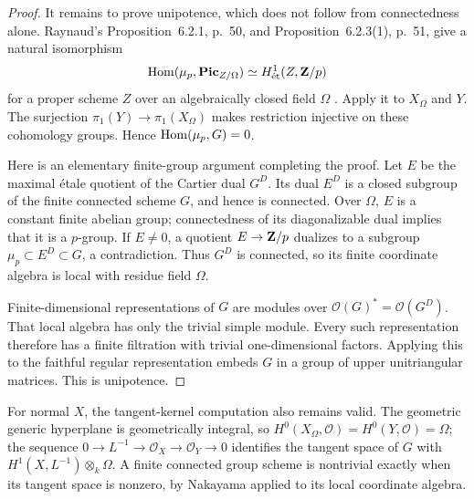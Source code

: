 \begin{proof}
It remains to prove unipotence, which does not follow from
connectedness alone. Raynaud's Proposition~6.2.1, p.~50, and
Proposition~6.2.3(1), p.~51, give a natural isomorphism
\[
 \operatorname{Hom}(\mu_p,\mathbf{Pic}_{Z/\Omega})
       \simeq H^1_{\text{ét}}(Z,\mathbf Z/p)
\]
for a proper scheme $Z$ over an algebraically closed field $\Omega$
\cite{Raynaud1970PicardDuality}. Apply it to $X_\Omega$ and $Y$.
The surjection $\pi_1(Y)\to\pi_1(X_\Omega)$ makes restriction
injective on these cohomology groups. Hence $\operatorname{Hom}(\mu_p,G)=0$.

Here is an elementary finite-group argument completing the proof.
Let $E$ be the maximal étale quotient of the Cartier dual $G^D$.
Its dual $E^D$ is a closed subgroup of the finite connected scheme
$G$, and hence is connected. Over $\Omega$, $E$ is a constant finite
abelian group; connectedness of its diagonalizable dual implies
that it is a $p$-group. If $E\ne0$, a quotient $E\to\mathbf Z/p$ dualizes
to a subgroup $\mu_p\subset E^D\subset G$, a contradiction.
Thus $G^D$ is connected, so its finite coordinate algebra is local
with residue field $\Omega$.

Finite-dimensional representations of $G$ are modules over
$\mathcal O(G)^*=\mathcal O(G^D)$. That local algebra has only the
trivial simple module. Every such representation therefore has a
finite filtration with trivial one-dimensional factors. Applying
this to the faithful regular representation embeds $G$ in a group
of upper unitriangular matrices. This is unipotence.
\end{proof}

For normal $X$, the tangent-kernel computation also remains valid.
The geometric generic hyperplane is geometrically integral, so
$H^0(X_\Omega,\mathcal O)=H^0(Y,\mathcal O)=\Omega$; the sequence
$0\to L^{-1}\to\mathcal O_X\to\mathcal O_Y\to0$ identifies the tangent
space of $G$ with $H^1(X,L^{-1})\otimes_k\Omega$. A finite connected
group scheme is nontrivial exactly when its tangent space is nonzero,
by Nakayama applied to its local coordinate algebra.

